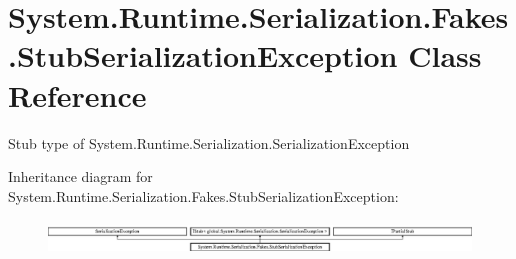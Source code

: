 \hypertarget{class_system_1_1_runtime_1_1_serialization_1_1_fakes_1_1_stub_serialization_exception}{\section{System.\-Runtime.\-Serialization.\-Fakes.\-Stub\-Serialization\-Exception Class Reference}
\label{class_system_1_1_runtime_1_1_serialization_1_1_fakes_1_1_stub_serialization_exception}
}


Stub type of System.\-Runtime.\-Serialization.\-Serialization\-Exception 


Inheritance diagram for System.\-Runtime.\-Serialization.\-Fakes.\-Stub\-Serialization\-Exception\-:\begin{figure}[H]
\begin{center}
\leavevmode
\includegraphics[height=0.935673cm]{class_system_1_1_runtime_1_1_serialization_1_1_fakes_1_1_stub_serialization_exception}
\end{center}
\end{figure}
